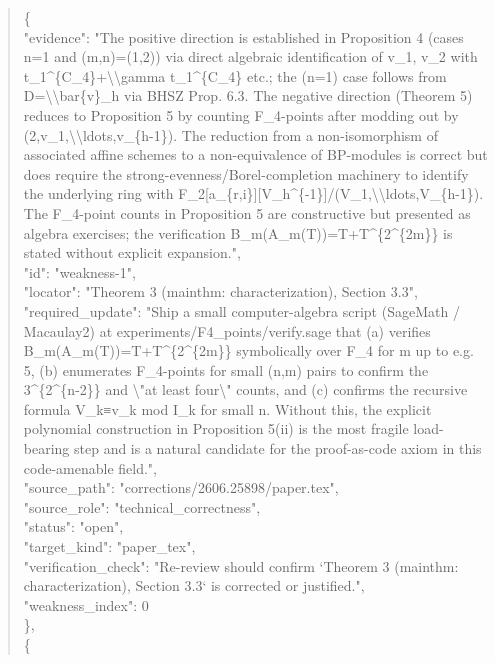 \documentclass[11pt]{article}
\begin{document}
\begin{quote}
    \{\\
      "evidence": "The positive direction is established in Proposition 4 (cases n=1 and (m,n)=(1,2)) via direct algebraic identification of v\_1, v\_2 with t\_1\^{}\{C\_4\}+\textbackslash{}\textbackslash{}gamma t\_1\^{}\{C\_4\} etc.; the (n=1) case follows from D=\textbackslash{}\textbackslash{}bar\{v\}\_h via BHSZ Prop. 6.3. The negative direction (Theorem 5) reduces to Proposition 5 by counting F\_4-points after modding out by (2,v\_1,\textbackslash{}\textbackslash{}ldots,v\_\{h-1\}). The reduction from a non-isomorphism of associated affine schemes to a non-equivalence of BP-modules is correct but does require the strong-evenness/Borel-completion machinery to identify the underlying ring with F\_2[a\_\{r,i\}][V\_h\^{}\{-1\}]/(V\_1,\textbackslash{}\textbackslash{}ldots,V\_\{h-1\}). The F\_4-point counts in Proposition 5 are constructive but presented as algebra exercises; the verification B\_m(A\_m(T))=T+T\^{}\{2\^{}\{2m\}\} is stated without explicit expansion.",\\
      "id": "weakness-1",\\
      "locator": "Theorem 3 (mainthm: characterization), Section 3.3",\\
      "required\_update": "Ship a small computer-algebra script (SageMath / Macaulay2) at experiments/F4\_points/verify.sage that (a) verifies B\_m(A\_m(T))=T+T\^{}\{2\^{}\{2m\}\} symbolically over F\_4 for m up to e.g. 5, (b) enumerates F\_4-points for small (n,m) pairs to confirm the 3\^{}\{2\^{}\{n-2\}\} and \textbackslash{}"at least four\textbackslash{}" counts, and (c) confirms the recursive formula V\_k≡v\_k mod I\_k for small n. Without this, the explicit polynomial construction in Proposition 5(ii) is the most fragile load-bearing step and is a natural candidate for the proof-as-code axiom in this code-amenable field.",\\
      "source\_path": "corrections/2606.25898/paper.tex",\\
      "source\_role": "technical\_correctness",\\
      "status": "open",\\
      "target\_kind": "paper\_tex",\\
      "verification\_check": "Re-review should confirm `Theorem 3 (mainthm: characterization), Section 3.3` is corrected or justified.",\\
      "weakness\_index": 0\\
    \},\\
    \{\\

\end{quote}
\end{document}
